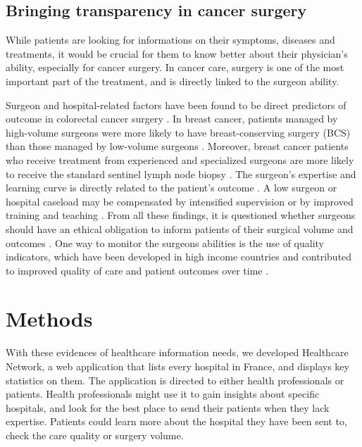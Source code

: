\subsection{Bringing transparency in cancer surgery}

While patients are looking for informations on their symptoms, diseases and
treatments, it would be crucial for them to know better about their physician's
ability, especially for cancer surgery. In cancer care, surgery is one of the
most important part of the treatment, and is directly linked to the surgeon
ability.

Surgeon and hospital-related factors have been found to be direct predictors of
outcome in colorectal cancer surgery \cite{renzulli_influence_2006,
    bonati_surgeon_2021}. In breast cancer, patients managed by high-volume surgeons
were more likely to have breast-conserving surgery (BCS) than those managed by
low-volume surgeons \cite{mcdermott_surgeon_2013}. Moreover, breast cancer
patients who receive treatment from experienced and specialized surgeons are
more likely to receive the standard sentinel lymph node biopsy
\cite{yen_surgeon_2014}. The surgeon's expertise and learning curve is directly
related to the patient's outcome \cite{renzulli_learning_2005}. A low surgeon or
hospital caseload may be compensated by intensified supervision or by improved
training and teaching \cite{bonati_surgeon_2021}. From all these findings, it is
questioned whether surgeons should have an ethical obligation to inform patients
of their surgical volume and outcomes \cite{glaser_surgeon_2019}. One way to
monitor the surgeons abilities is the use of quality indicators, which have been
developed in high income countries and contributed to improved quality of care
and patient outcomes over time \cite{nietz_quality_2020}.

\section{Methods}

With these evidences of healthcare information needs, we developed Healthcare
Network, a web application that lists every hospital in France, and displays key
statistics on them. The application is directed to either health professionals
or patients. Health professionals might use it to gain insights about specific
hospitals, and look for the best place to send their patients when they lack
expertise. Patients could learn more about the hospital they have been sent to,
check the care quality or surgery volume.

